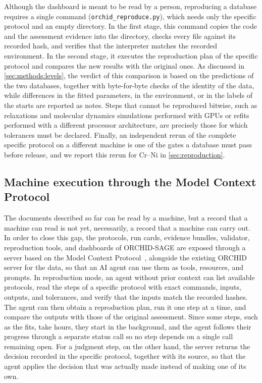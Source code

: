 Although the dashboard is meant to be read by a person, reproducing a database requires a single command (\texttt{orchid\_reproduce.py}), which needs only the specific protocol and an empty directory. In the first stage, this command copies the code and the assessment evidence into the directory, checks every file against its recorded hash, and verifies that the interpreter matches the recorded environment. In the second stage, it executes the reproduction plan of the specific protocol and compares the new results with the original ones. As discussed in \cref{sec:methods:levels}, the verdict of this comparison is based on the predictions of the two databases, together with byte-for-byte checks of the identity of the data, while differences in the fitted parameters, in the environment, or in the labels of the starts are reported as notes. Steps that cannot be reproduced bitwise, such as relaxations and molecular dynamics simulations performed with GPUs or refits performed with a different processor architecture, are precisely those for which tolerances must be declared. Finally, an independent rerun of the complete specific protocol on a different machine is one of the gates a database must pass before release, and we report this rerun for Cr--Ni in \cref{sec:reproduction}.

\subsection{Machine execution through the Model Context Protocol}
\label{sec:methods:mcp}

The documents described so far can be read by a machine, but a record that a machine can read is not yet, necessarily, a record that a machine can carry out. In order to close this gap, the protocols, run cards, evidence bundles, validator, reproduction tools, and dashboards of ORCHID-SAGE are exposed through a server based on the Model Context Protocol~\cite{mcp}, alongside the existing ORCHID server for the data, so that an AI agent can use them as tools, resources, and prompts. In reproduction mode, an agent without prior context can list available protocols, read the steps of a specific protocol with exact commands, inputs, outputs, and tolerances, and verify that the inputs match the recorded hashes. The agent can then obtain a reproduction plan, run it one step at a time, and compare the outputs with those of the original assessment. Since some steps, such as the fits, take hours, they start in the background, and the agent follows their progress through a separate status call so no step depends on a single call remaining open. For a judgment step, on the other hand, the server returns the decision recorded in the specific protocol, together with its source, so that the agent applies the decision that was actually made instead of making one of its own.

